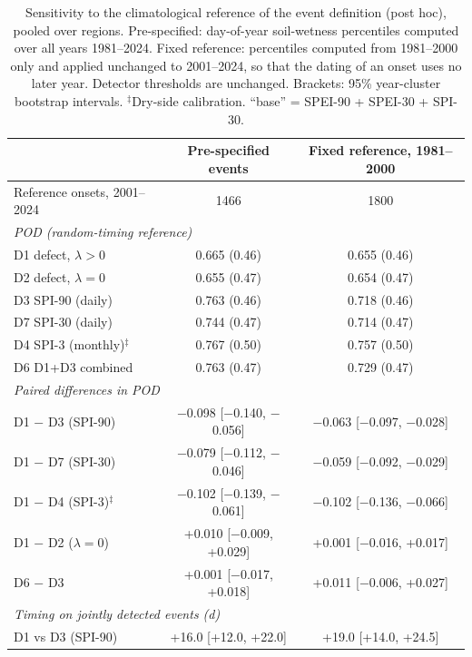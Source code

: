 \begin{table}[tbp]
\caption{Sensitivity to the climatological reference of the event definition (post hoc), pooled over
regions. Pre-specified: day-of-year soil-wetness percentiles computed over all years 1981--2024. Fixed
reference: percentiles computed from 1981--2000 only and applied unchanged to 2001--2024, so that the
dating of an onset uses no later year. Detector thresholds are unchanged. Brackets: 95\% year-cluster
bootstrap intervals. $^{\ddagger}$Dry-side calibration. ``base'' = SPEI-90 + SPEI-30 + SPI-30.}
\label{tab:fixedref}
\footnotesize\setlength{\tabcolsep}{3pt}
\begin{tabular*}{\textwidth}{@{\extracolsep\fill}lcc}
\toprule
& Pre-specified events & Fixed reference, 1981--2000\\
\midrule
Reference onsets, 2001--2024 & 1466 & 1800 \\
\midrule
\multicolumn{3}{l}{\textit{POD (random-timing reference)}}\\
\quad D1 defect, $\lambda>0$ & 0.665 (0.46) & 0.655 (0.46) \\
\quad D2 defect, $\lambda=0$ & 0.655 (0.47) & 0.654 (0.47) \\
\quad D3 SPI-90 (daily) & 0.763 (0.46) & 0.718 (0.46) \\
\quad D7 SPI-30 (daily) & 0.744 (0.47) & 0.714 (0.47) \\
\quad D4 SPI-3 (monthly)$^{\ddagger}$ & 0.767 (0.50) & 0.757 (0.50) \\
\quad D6 D1+D3 combined & 0.763 (0.47) & 0.729 (0.47) \\
\midrule
\multicolumn{3}{l}{\textit{Paired differences in POD}}\\
\quad D1 $-$ D3 (SPI-90) & $-$0.098 [$-$0.140, $-$0.056] & $-$0.063 [$-$0.097, $-$0.028] \\
\quad D1 $-$ D7 (SPI-30) & $-$0.079 [$-$0.112, $-$0.046] & $-$0.059 [$-$0.092, $-$0.029] \\
\quad D1 $-$ D4 (SPI-3)$^{\ddagger}$ & $-$0.102 [$-$0.139, $-$0.061] & $-$0.102 [$-$0.136, $-$0.066] \\
\quad D1 $-$ D2 ($\lambda=0$) & +0.010 [$-$0.009, +0.029] & +0.001 [$-$0.016, +0.017] \\
\quad D6 $-$ D3 & +0.001 [$-$0.017, +0.018] & +0.011 [$-$0.006, +0.027] \\
\midrule
\multicolumn{3}{l}{\textit{Timing on jointly detected events (d)}}\\
\quad D1 vs D3 (SPI-90) & +16.0 [+12.0, +22.0] & +19.0 [+14.0, +24.5] \\

\end{tabular*}
\end{table}
